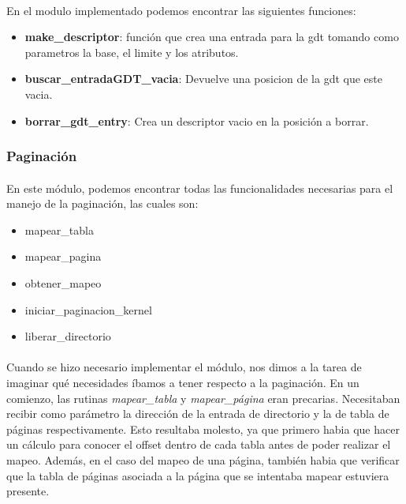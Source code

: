 \documentclass[11pt, a4paper]{article}
\begin{document}
\paragraph{}
En el modulo implementado podemos encontrar las siguientes funciones:

\begin{itemize}
\item \textbf{make\_descriptor}: función que crea una entrada para la gdt tomando como parametros la base, el limite y los atributos.
\item \textbf{buscar\_entradaGDT\_vacia}: Devuelve una posicion de la gdt que este vacia.
\item \textbf{borrar\_gdt\_entry}: Crea un descriptor vacio en la posición a borrar.
\end{itemize}

\subsubsection{Paginación}
\paragraph{}
En este módulo, podemos encontrar todas las funcionalidades necesarias para el manejo de la paginación, las cuales son:
\begin{itemize}
\item mapear\_tabla
\item mapear\_pagina
\item obtener\_mapeo
\item iniciar\_paginacion\_kernel
\item liberar\_directorio
\end{itemize}

\paragraph{}
Cuando se hizo necesario implementar el módulo, nos dimos a la tarea de imaginar qué necesidades íbamos a tener respecto a la paginación. En un comienzo, las rutinas \textit{mapear\_tabla} y \textit{mapear\_página} eran precarias. Necesitaban recibir como parámetro la dirección de la entrada de directorio y la de tabla de páginas respectivamente. Esto resultaba molesto, ya que primero habia que hacer un cálculo para conocer el offset dentro de cada tabla antes de poder realizar el mapeo. Además, en el caso del mapeo de una página, también habia que verificar que la tabla de páginas asociada a la página que se intentaba mapear estuviera presente.
\end{document}
